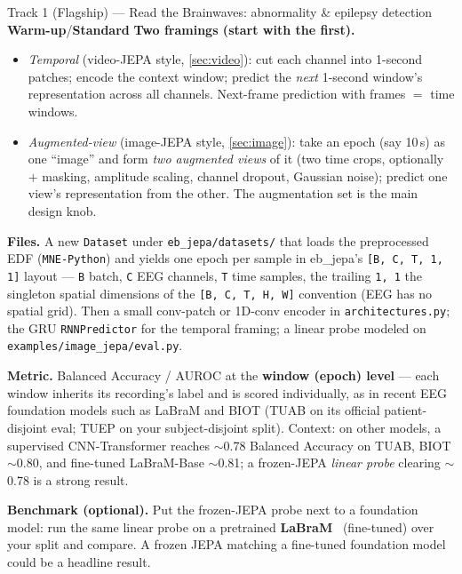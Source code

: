 \documentclass{article}
\newcommand{\code}[1]{\texttt{\small #1}}
\newcommand{\file}[1]{\texttt{\small #1}}
\newcommand{\diffeasy}{\colorbox{ebgreen!18}{\textcolor{ebgreen}{\small\bfseries Warm-up}}}
\newcommand{\diffmed}{\colorbox{ebamber!18}{\textcolor{ebamber}{\small\bfseries Standard}}}
\begin{document}
\begin{trackbox}{Track 1 (Flagship) --- Read the Brainwaves: abnormality \& epilepsy detection \hfill \diffeasy{}/\diffmed{}}
\smallskip
\textbf{Two framings (start with the first).}
\begin{itemize}[leftmargin=1.4em,itemsep=1pt,topsep=2pt]
  \item \emph{Temporal} (video-JEPA style, \cref{sec:video}): cut each channel into
    1-second patches; encode the context window; predict the \emph{next} 1-second
    window's representation across all channels. Next-frame prediction with
    frames $=$ time windows.
  \item \emph{Augmented-view} (image-JEPA style, \cref{sec:image}): take an epoch
    (say 10\,s) as one ``image'' and form \emph{two augmented views} of it (two time
    crops, optionally $+$ masking, amplitude scaling, channel dropout, Gaussian noise);
    predict one view's representation from the other. The augmentation set is the main
    design knob.
\end{itemize}

\smallskip
\textbf{Files.} A new \code{Dataset} under \file{eb\_jepa/datasets/} that loads the
preprocessed EDF (\code{MNE-Python}) and yields one epoch per sample in eb\_jepa's
\code{[B, C, T, 1, 1]} layout --- \code{B} batch, \code{C} EEG channels, \code{T} time
samples, the trailing \code{1, 1} the singleton spatial dimensions of the
\code{[B, C, T, H, W]} convention (EEG has no spatial grid). Then a small conv-patch or
1D-conv encoder in \file{architectures.py}; the GRU \code{RNNPredictor} for the temporal
framing; a linear probe modeled on \file{examples/image\_jepa/eval.py}.

\smallskip
\textbf{Metric.} Balanced Accuracy / AUROC at the \textbf{window (epoch) level} --- each
window inherits its recording's label and is scored individually, as in recent EEG
foundation models such as LaBraM and BIOT (TUAB on its official patient-disjoint eval;
TUEP on your subject-disjoint split). Context: on other models, a supervised CNN-Transformer reaches $\sim$0.78 Balanced
Accuracy on TUAB, BIOT $\sim$0.80, and fine-tuned LaBraM-Base $\sim$0.81; a frozen-JEPA
\emph{linear probe} clearing $\sim$0.78 is a strong result.

\smallskip
\textbf{Benchmark (optional).} Put the frozen-JEPA probe next to a foundation model: run
the same linear probe on a pretrained \textbf{LaBraM}~\citep{LaBraM} (fine-tuned) over
your split and compare. A frozen JEPA matching a fine-tuned foundation model could be a
headline result.


\end{trackbox}
\end{document}
